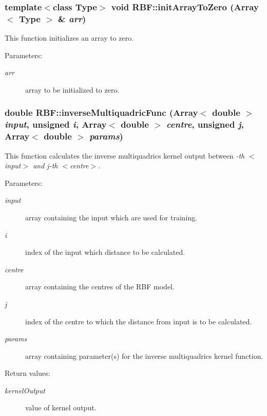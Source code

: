 \subsubsection{\setlength{\rightskip}{0pt plus 5cm}template$<$class Type$>$ void RBF::init\-Array\-To\-Zero (Array$<$ Type $>$ \& {\em arr})\hspace{0.3cm}{\tt  [inline, static]}}\label{classRBF_e17}


This function initializes an array to zero. 

\begin{Desc}
\item[Parameters:]
\begin{description}
\item[{\em arr}]array to be initialized to zero.\end{description}
\end{Desc}
\subsubsection{\setlength{\rightskip}{0pt plus 5cm}double RBF::inverse\-Multiquadric\-Func (Array$<$ double $>$ {\em input}, unsigned {\em i}, Array$<$ double $>$ {\em centre}, unsigned {\em j}, Array$<$ double $>$ {\em params})\hspace{0.3cm}{\tt  [static]}}\label{classRBF_e5}


This function calculates the inverse multiquadrics kernel output between {\em -th $<$input$>$ and j-th $<$centre$>$. \/}

\begin{Desc}
\item[Parameters:]
\begin{description}
\item[{\em input}]array containing the input which are used for training. \item[{\em i}]index of the input which distance to be calculated. \item[{\em centre}]array containing the centres of the RBF model. \item[{\em j}]index of the centre to which the distance from input is to be calculated. \item[{\em params}]array containing parameter(s) for the inverse multiquadrics kernel function. \end{description}
\end{Desc}
\begin{Desc}
\item[Return values:]
\begin{description}
\item[{\em kernel\-Output}]value of kernel output.\end{description}
\end{Desc}
